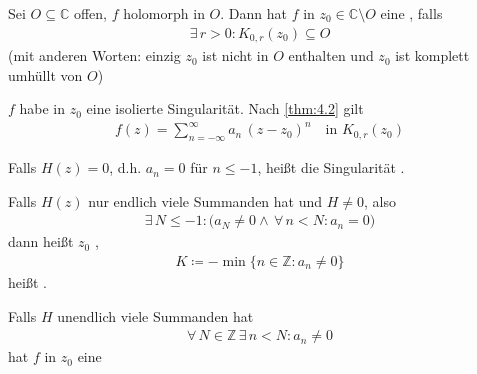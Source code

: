 \begin{theorem}[Definition]
  \begin{enum-arab}
    \item Sei $O \subseteq \mathbb{C}$ offen, $f$ holomorph in $O$. Dann hat $f$ in $z_0 \in \mathbb{C} \setminus O$ eine , falls
    \begin{align*}
      \exists \, r > 0 : K_{0,r}(z_0) \subseteq O
    \end{align*}
    (mit anderen Worten: einzig $z_0$ ist nicht in $O$ enthalten und $z_0$ ist komplett umhüllt von $O$)
    
    \item $f$ habe in $z_0$ eine isolierte Singularität. Nach \ref{thm:4.2} gilt
    \begin{align*}
      f(z) = \sum\limits_{n = -\infty}^{\infty} a_n \, (z-z_0)^n \quad \text{in } K_{0,r}(z_0)
    \end{align*}
    \begin{enum-alph}
      \item Falls $H(z) = 0$, d.h. $a_n = 0$ für $n \leq -1$, heißt die Singularität . 
      
      \item Falls $H(z)$ nur endlich viele Summanden hat und $H \neq 0$, also
      \begin{align*}
        \exists \, N \leq -1 : \big( a_N \neq 0 \land \, \forall \, n < N : a_n = 0 \big)
      \end{align*}
      dann heißt $z_0$ ,
      \begin{align*}
        K \coloneq - \min \{ n \in \mathbb{Z} : a_n \neq 0 \}
      \end{align*}
      heißt .
      
      \item Falls $H$ unendlich viele Summanden hat
      \begin{align*}
        \forall \, N \in \mathbb{Z} \, \exists \, n < N : a_n \neq 0
      \end{align*}
      hat $f$ in $z_0$ eine 
    \end{enum-alph}
  \end{enum-arab}
\end{theorem}

